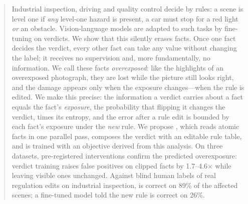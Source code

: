 \begin{abstract}
Industrial inspection, driving and quality control decide by rules: a scene is level one if \emph{any} level-one hazard is present, a car must stop for a red light \emph{or} an obstacle. Vision-language models are adapted to such tasks by fine-tuning on verdicts. We show that this silently erases facts. Once one fact decides the verdict, every other fact can take any value without changing the label; it receives no supervision and, more fundamentally, no information. We call these facts \emph{overexposed}: like the highlights of an overexposed photograph, they are lost while the picture still looks right, and the damage appears only when the exposure changes---when the rule is edited. We make this precise: the information a verdict carries about a fact equals the fact's \emph{exposure}, the probability that flipping it changes the verdict, times its entropy, and the error after a rule edit is bounded by each fact's exposure under the \emph{new} rule. We propose \lux, which reads atomic facts in one parallel pass, composes the verdict with an editable rule table, and is trained with an objective derived from this analysis. On three datasets, pre-registered interventions confirm the predicted overexposure: verdict training raises false positives on clipped facts by 1.7--4.6$\times$ while leaving visible ones unchanged. Against blind human labels of real regulation edits on industrial inspection, \lux is correct on 89\% of the affected scenes; a fine-tuned model told the new rule is correct on 26\%.
\end{abstract}
